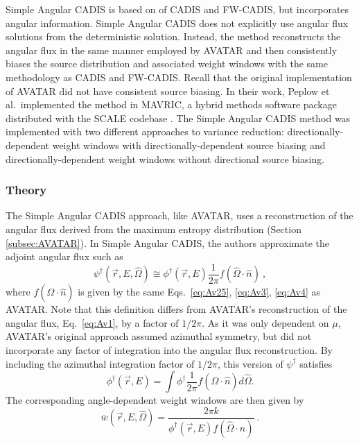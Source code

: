 Simple Angular CADIS \cite{peplow_consistent_2012} is based on
of CADIS and FW-CADIS, but incorporates angular information. Simple Angular CADIS does not explicitly use
angular flux solutions from the deterministic solution.
Instead, the method reconstructs the angular flux in the same manner employed by
AVATAR and then consistently
biases the
source distribution and associated weight windows with the same methodology as CADIS
and FW-CADIS. Recall that the original
implementation of AVATAR did not have consistent source biasing.
In their work, Peplow et al.\ implemented the method
in MAVRIC, a hybrid methods software package distributed with the SCALE
codebase \cite{SCALE6_1}. The Simple Angular CADIS method was implemented with two different
approaches to variance reduction:
directionally-dependent weight windows with directionally-dependent source
biasing and directionally-dependent weight windows without directional source
biasing.

\subsubsection*{Theory}

The Simple Angular CADIS approach, like AVATAR, uses a reconstruction of the
angular flux derived from the maximum entropy distribution (Section
\ref{subsec:AVATAR}). In Simple Angular CADIS, the authors approximate the adjoint
angular flux such as
%
\begin{equation}
\psi^{\dagger}(\vec{r}, E, \hat \Omega) \cong \phi^{\dagger}(\vec{r}, E)
\frac{1}{2\pi} f(\hat\Omega \cdot \hat n)\:,
\label{eq:AvAngflux}
\end{equation}
where $f(\hat\Omega \cdot \hat n)$ is given by the same Eqs.\
\eqref{eq:Av25}, \eqref{eq:Av3}, \eqref{eq:Av4} as AVATAR.
Note that this definition differs from AVATAR's reconstruction of the angular flux,
Eq.\ \eqref{eq:Av1}, by a factor of $1/2\pi$. As it was only dependent on
$\mu$, AVATAR's original approach assumed azimuthal symmetry, but did not
incorporate any factor of integration into the angular flux reconstruction. By
including the azimuthal integration factor of $1/2\pi$, this version of
$\psi^{\dagger}$ satisfies
\begin{equation*}
  \phi^{\dagger}(\vec{r}, E) = \int \phi^{\dagger} \frac{1}{2\pi} f(\hat\Omega
  \cdot \hat n) d \hat\Omega .
\end{equation*}
The corresponding angle-dependent weight windows are then given by
\begin{equation}
\bar {w} (\vec{r},E,\hat\Omega) = \frac{2 \pi k}{\phi^{\dagger}(\vec{r},E)
                                  f(\hat\Omega \cdot n)}\:.
\end{equation}


